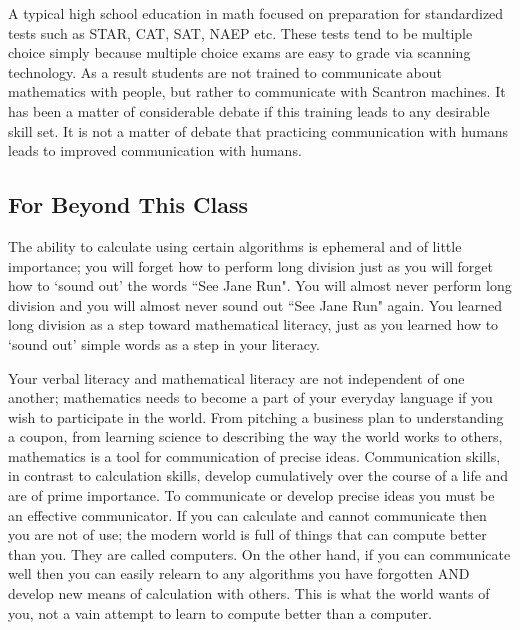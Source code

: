 \documentclass[12pt]{article}
\begin{document}
A typical high school education in math %
focused on preparation for standardized tests such as STAR, CAT, SAT, NAEP etc. These tests tend to be multiple choice simply because multiple choice exams are easy to grade via scanning technology. 
As a result students are not trained to communicate about mathematics with people, 
but rather to communicate with Scantron machines. 
It has been a matter of considerable debate if this training leads to any desirable skill set. It is not a matter of debate that practicing communication with humans leads to improved communication with humans. 

\subsection*{For Beyond This Class} 
The ability to calculate using certain algorithms is ephemeral and of little importance; 
you will forget how to perform long division just as you will forget how to `sound out' the words ``See Jane Run". 
You will almost never perform long division 
and you will almost never sound out ``See Jane Run" again. 
You learned long division as a step toward mathematical literacy, 
just as you learned how to `sound out' simple words as a step in your literacy. 

Your verbal literacy and mathematical literacy are not independent of one another; mathematics needs to become a part of your everyday language if you wish to participate in the world. 
From pitching a business plan to understanding a coupon, 
from learning science to describing the way the world works to others, 
mathematics is a tool for communication of precise ideas.
Communication skills, in contrast to calculation skills, develop cumulatively over the course of a life and are of prime importance. 
To communicate or develop precise ideas you must be an effective communicator. 
If you can calculate and cannot communicate then you are not of use; the modern world is full of things that can compute better than you. They are called computers. On the other hand, if you can communicate well 
then you can easily relearn to any algorithms you have forgotten 
AND develop new means of calculation with others. 
This is what the world wants of you, not a vain attempt to learn to compute better than a computer.
\end{document}
